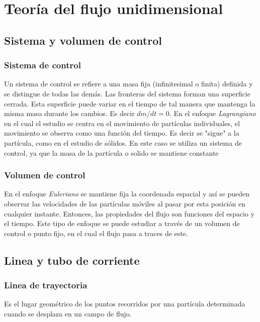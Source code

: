 \section{Teoría del flujo unidimensional}


\subsection{Sistema y volumen de control}

\subsubsection{Sistema de control}
Un sistema de control se refiere a una masa fija (infinitesimal o finita) definida y se distingue de todas las demás. Las fronteras del sistema forman una superficie cerrada. Esta superficie puede variar en el tiempo de tal manera que mantenga la misma masa durante los cambios. Es decir $dm/dt = 0$.
En el enfoque \emph{Lagrangiano} en el cual el estudio se centra en el movimiento de partículas individuales, el movimiento se observa como una función del tiempo. Es decir se "sigue" a la partícula, como en el estudio de sólidos. En este caso se utiliza un sistema de control, ya que la masa de la partícula o solido se mantiene constante

\subsubsection{Volumen de control}
En el enfoque \emph{Euleriano} se mantiene fija la coordenada espacial y así se pueden observar las velocidades de las partículas móviles al pasar por esta posición en cualquier instante. Entonces, las propiedades del flujo son funciones del espacio y el tiempo.
Este tipo de enfoque se puede estudiar a través de un volumen de control o punto fijo, en el cual el flujo pasa a traces de este.

\subsection{Linea y tubo de corriente}

\subsubsection{Linea de trayectoria}
Es el lugar geométrico de los puntos recorridos por una partícula determinada cuando se desplaza en un campo de flujo.

